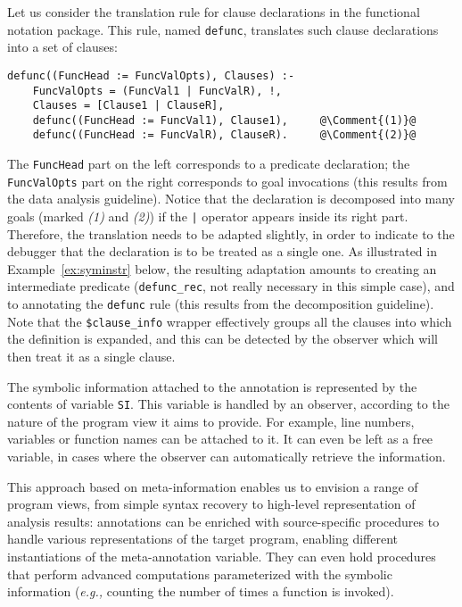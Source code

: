\documentclass[preprint]{llncs}
\newcommand*{\Comment}[1]{\hfill\makebox[6.0cm][l]{\rm\it \color{red!70!black}#1}}\newcommand*{\Var}[1]{{\tt\textup{#1}}}
\newcommand{\eg}{\emph{e.g.,\xspace}}
\newcommand{\pre}[1]{\texttt{#1}}
\begin{document}
\begin{example}
\label{ex:instr}
Let us consider the translation rule for clause declarations in the
functional notation package. This rule, named \pre{defunc}, translates
such clause declarations into a set of clauses:
\begin{lstlisting}[frame=none,escapechar=@,numbers=none]
defunc((FuncHead := FuncValOpts), Clauses) :- 
    FuncValOpts = (FuncVal1 | FuncValR), !, 
    Clauses = [Clause1 | ClauseR],
    defunc((FuncHead := FuncVal1), Clause1),     @\Comment{(1)}@
    defunc((FuncHead := FuncValR), ClauseR).     @\Comment{(2)}@
\end{lstlisting}
\end{example}

The \pre{FuncHead} part on the left corresponds to a predicate
declaration; the \pre{FuncValOpts} part on the right corresponds to
goal invocations (this results from the data analysis guideline).
Notice that the declaration is decomposed into many goals (marked
\emph{(1)} and \emph{(2)}) if the \pre{|} operator appears inside its
right part. Therefore, the translation needs to be adapted slightly,
in order to indicate to the debugger that the declaration is to be
treated as a single one. As illustrated in Example~\ref{ex:syminstr}
below, the resulting adaptation amounts to creating an intermediate
predicate (\pre{defunc\_rec}, not really necessary in this simple
case), and to annotating the \pre{defunc} rule (this results from the
decomposition guideline).  Note that the \pre{\$clause\_info} wrapper
effectively groups all the clauses into which the definition is
expanded, and this can be detected by the observer which will then
treat it as a single clause.

The symbolic information attached to the annotation is represented by
the contents of variable \pre{SI}. This variable is handled by an
observer, according to the nature of the program view it aims to
provide. For example, line numbers, variables or function names can be
attached to it.  It can even be left as a free variable, in cases
where the observer can automatically retrieve the information.

This approach based on meta-information enables us to envision a range of
program views, from simple syntax recovery to high-level representation of
analysis results: annotations can be enriched with source-specific procedures
to handle various representations of the target program, enabling different
instantiations of the meta-annotation variable. They can even hold procedures
that perform advanced computations parameterized with the symbolic information (\eg
counting the number of times a function is invoked).
\end{document}
